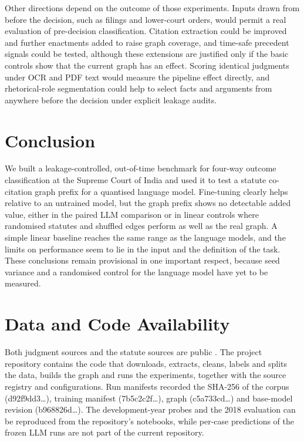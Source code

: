 \documentclass[11pt,a4paper]{article}
\begin{document}
Other directions depend on the outcome of those experiments. Inputs drawn from before the decision, such as filings and lower-court orders, would permit a real evaluation of pre-decision classification. Citation extraction could be improved and further enactments added to raise graph coverage, and time-safe precedent signals \cite{r50} could be tested, although these extensions are justified only if the basic controls show that the current graph has an effect. Scoring identical judgments under OCR and PDF text would measure the pipeline effect directly, and rhetorical-role segmentation \cite{r41} could help to select facts and arguments from anywhere before the decision under explicit leakage audits.

\section{Conclusion}\label{sec:conclusion}
We built a leakage-controlled, out-of-time benchmark for four-way outcome classification at the Supreme Court of India and used it to test a statute co-citation graph prefix for a quantised language model. Fine-tuning clearly helps relative to an untrained model, but the graph prefix shows no detectable added value, either in the paired LLM comparison or in linear controls where randomised statutes and shuffled edges perform as well as the real graph. A simple linear baseline reaches the same range as the language models, and the limits on performance seem to lie in the input and the definition of the task. These conclusions remain provisional in one important respect, because seed variance and a randomised control for the language model have yet to be measured.

\section*{Data and Code Availability}
Both judgment sources and the statute sources are public \cite{r29,r30,r62}. The project repository contains the code that downloads, extracts, cleans, labels and splits the data, builds the graph and runs the experiments, together with the source registry and configurations. Run manifests recorded the SHA-256 of the corpus (d92f9dd3\ldots), training manifest (7b5c2c2f\ldots), graph (c5a733cd\ldots) and base-model revision (b968826d\ldots). The development-year probes and the 2018 evaluation can be reproduced from the repository's notebooks, while per-case predictions of the frozen LLM runs are not part of the current repository.
\end{document}
